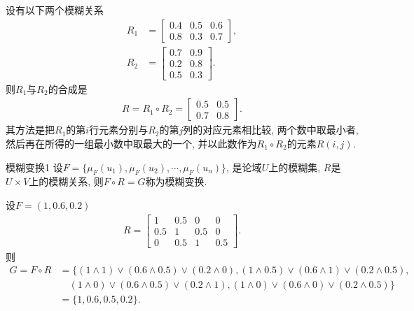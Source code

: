 \begin{example}
设有以下两个模糊关系
\begin{align*}
  R_{1}&=\left[\begin{array}{ccc}{0.4} & {0.5} & {0.6} \\ {0.8} & {0.3} & {0.7}\end{array}\right],\\
  R_{2}&=\left[\begin{array}{cc}{0.7} & {0.9} \\ {0.2} & {0.8} \\ {0.5} & {0.3}\end{array}\right].
\end{align*}
则$R_1$与$R_2$的合成是
\begin{align}
    R=R_{1} \circ R_{2}=\left[\begin{array}{ll}{0.5} & {0.5} \\ {0.7} & {0.8}\end{array}\right].
\end{align}
其方法是把$R_1$的第$i$行元素分别与$R_2$的第$j$列的对应元素相比较, 两个数中取最小者, 然后再在所得的一组最小数中取最大的一个, 并以此数作为$R_1\circ R_2$的元素$R(i,j)$.
\end{example}
\begin{mydef}{模糊变换}{1}
    设$F=\{\mu_F(u_1),\mu_F(u_2),\cdots, \mu_F(u_n)\}$, 是论域$U$上的模糊集, $R$是$U\times V$上的模糊关系, 则$F\circ R=G$称为模糊变换.
\end{mydef}
\begin{example}
设$F=(1, 0.6, 0.2)$
\begin{align}
  R=\left[
  \begin{array}{cccc}
  {1} & {0.5} & {0} & {0} \\
  {0.5} & {1} & {0.5} & {0} \\
  {0} & {0.5} & {1} & {0.5}
  \end{array}
  \right].
\end{align}
则
\begin{align*}
  G=F\circ R&=\{(1\wedge 1)\vee (0.6\wedge 0.5)\vee (0.2\wedge 0), (1\wedge 0.5)\vee (0.6\wedge 1)\vee (0.2\wedge 0.5),\\
            &\quad  (1\wedge 0)\vee (0.6\wedge 0.5)\vee (0.2\wedge 1), (1\wedge 0)\vee (0.6\wedge 0)\vee (0.2\wedge 0.5)\}\\
            & =\{1, 0.6, 0.5, 0.2\}.
\end{align*}
\end{example}
